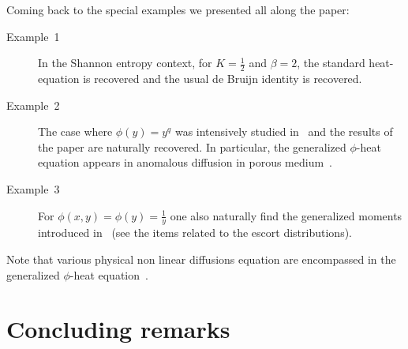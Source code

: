 \documentclass[english,sort&compress]{elsarticle}
\theoremstyle{definition}
\theoremstyle{plain}
\theoremstyle{plain}
\begin{document}
Coming back to the special examples we presented all along the paper:
%
\begin{description}%
\item[Example~1] In the Shannon entropy context,  for $K = \frac12$ and $\beta =
  2$, the standard  heat-equation is recovered and the usual  de Bruijn identity
  is recovered.
%
\item[Example~2]  The  case  where  $\phi(y)  =  y^q$  was  intensively  studied
  in~\cite{Ber13:08} and the  results of the paper are  naturally recovered.  In
  particular,  the   generalized  $\phi$-heat  equation   appears  in  anomalous
  diffusion in porous medium~\cite{TsaLen02, Ber13:08, Vaz06}.
%
\item[Example~3] For $\phi(x,y) = \phi(y) = \frac{1}{y}$ one also naturally find
  the generalized moments introduced in~\cite{TsaMen98, MarNic00} (see the items
  related to the escort distributions).\jfb{!!!!!!}
\end{description}

Note that various physical non linear diffusions equation are encompassed in the
generalized $\phi$-heat equation~\cite{GilKer04, Vaz06}.




\section{Concluding remarks}
\label{sec:Conclusion}
\end{document}
